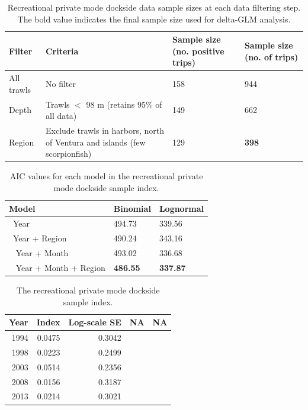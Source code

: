 \documentclass[12pt,]{article}
\begin{document}
\begin{table}[ht]
\centering
\caption{Recreational private mode dockside data sample 
                                          sizes at each data filtering step.  
                                          The bold value indicates the final sample size 
                                          used for delta-GLM analysis.} 
\label{tab:Fleet11_SCBSurvey_filter}
\begin{tabular}{>{\raggedright}p{1.5in}>{\raggedright}p{2.6in}>{\raggedright}p{1in}>{\raggedright}p{1in}}
  \hline
Filter & Criteria & Sample size (no. positive trips) & Sample size (no. of trips) \\ 
  \hline
All trawls & No filter & 158 & 944 \\ 
  Depth & Trawls $<$ 98 m (retains 95\% of all data) & 149 & 662 \\ 
  Region & Exclude trawls in harbors, north of Ventura and islands (few scorpionfish) & 129 & \textbf{398} \\ 
   \hline
\end{tabular}
\end{table}\begin{table}[ht]
\centering
\caption{AIC values for each model in the
                                          recreational private mode dockside sample 
                                          index.} 
\label{tab:Fleet11_SCBSurvey_aic}
\begin{tabular}{lll}
  \hline
Model & Binomial & Lognormal \\ 
  \hline
~Year & 494.73 & 339.56 \\ 
  ~Year + Region & 490.24 & 343.16 \\ 
  ~ Year + Month & 493.02 & 336.68 \\ 
  ~ Year + Month + Region & \textbf{486.55} & \textbf{337.87} \\ 
   \hline
\end{tabular}
\end{table}\begin{table}[ht]
\centering
\caption{The recreational private mode 
                                            dockside sample index.} 
\label{tab:Fleet11_SCBSurvey_index}
\begin{tabular}{rrrll}
  \hline
Year & Index & Log-scale SE & NA & NA \\ 
  \hline
 1994 & 0.0475 & 0.3042 &  &  \\ 
   1998 & 0.0223 & 0.2499 &  &  \\ 
   2003 & 0.0514 & 0.2356 &  &  \\ 
   2008 & 0.0156 & 0.3187 &  &  \\ 
   2013 & 0.0214 & 0.3021 &  &  \\ 
   \hline
\end{tabular}
\end{table}
\end{document}
